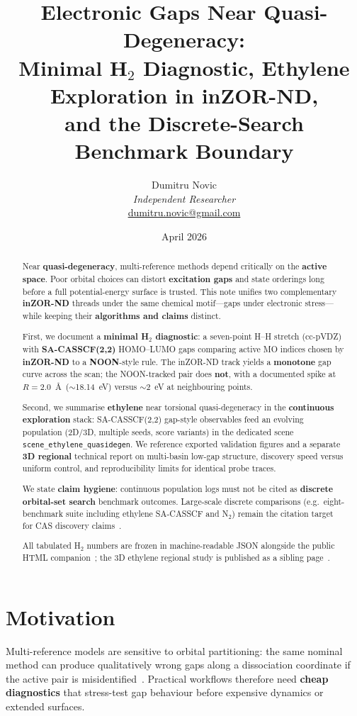 \documentclass[11pt,a4paper]{article}
\title{\textbf{Electronic Gaps Near Quasi-Degeneracy:\\[0.25em]
Minimal \texorpdfstring{H$_2$}{H2} Diagnostic, Ethylene Exploration in \mbox{inZOR-ND},\\[0.15em]
and the Discrete-Search Benchmark Boundary}}
\author{
  Dumitru Novic\\[0.2em]
  \textit{Independent Researcher}\\[0.2em]
  \small\href{mailto:dumitru.novic@gmail.com}{dumitru.novic@gmail.com}
}
\date{April 2026}
\begin{document}
\maketitle

\begin{abstract}
\begin{sloppypar}
Near \textbf{quasi-degeneracy}, multi-reference methods depend critically on the
\textbf{active space}. Poor orbital choices can distort \textbf{excitation gaps}
and state orderings long before a full potential-energy surface is trusted.
This note unifies two complementary \textbf{inZOR-ND} threads under the same
chemical motif---gaps under electronic stress---while keeping their
\textbf{algorithms and claims} distinct.

First, we document a \textbf{minimal H$_2$ diagnostic}: a seven-point H--H
stretch (cc-pVDZ) with \textbf{SA-CASSCF(2,2)} HOMO--LUMO gaps comparing active
MO indices chosen by \textbf{inZOR-ND} to a \textbf{NOON}-style rule. The inZOR-ND
track yields a \textbf{monotone} gap curve across the scan; the NOON-tracked pair
does \textbf{not}, with a documented spike at $R=2.0$~\AA\ ($\sim$18.14~eV)
versus $\sim$2~eV at neighbouring points.

Second, we summarise \textbf{ethylene} near torsional quasi-degeneracy in the
\textbf{continuous exploration} stack: SA-CASSCF(2,2) gap-style observables feed
an evolving population (2D/3D, multiple seeds, score variants) in the dedicated
scene \texttt{scene\_ethylene\_quasidegen}. We reference exported validation
figures and a separate \textbf{3D regional} technical report on multi-basin
low-gap structure, discovery speed versus uniform control, and reproducibility
limits for identical probe traces.

We state \textbf{claim hygiene}: continuous population logs must not be cited as
\textbf{discrete orbital-set search} benchmark outcomes. Large-scale discrete
comparisons (e.g.\ eight-benchmark suite including ethylene SA-CASSCF and
N$_2$) remain the citation target for CAS discovery claims~\citep{inZORNDActiveSpace2026}.

All tabulated H$_2$ numbers are frozen in machine-readable JSON alongside the
public HTML companion~\citep{inZORNDQCGaps2026}; the 3D ethylene regional study
is published as a sibling page~\citep{inZORNDEthylene3D2026}.
\end{sloppypar}
\end{abstract}

\section{Motivation}
Multi-reference models are sensitive to orbital partitioning: the same nominal
method can produce qualitatively wrong gaps along a dissociation coordinate if
the active pair is misidentified~\citep{Helgaker2000Molecular}. Practical
workflows therefore need \textbf{cheap diagnostics} that stress-test gap
behaviour before expensive dynamics or extended surfaces.
\end{document}
